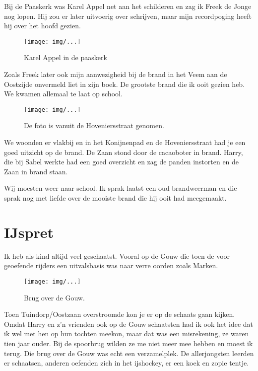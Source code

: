 \documentclass[10pt,twoside,openright]{memoir}
\begin{document}
Bij de Paaskerk was Karel Appel net aan het schilderen en zag ik Freek de Jonge nog lopen. Hij zou er later uitvoerig over schrijven, maar mijn recordpoging heeft hij over het hoofd gezien. 

\begin{figure}[t]
\texttt{[image: img/...]}
\caption{Karel Appel in de paaskerk}
\end{figure}

Zoals Freek later ook mijn aanwezigheid bij de brand in het Veem aan de Oostzijde onvermeld liet in zijn boek. De grootste brand die ik ooit gezien heb. We kwamen allemaal te laat op school. 

\begin{figure}[t]
\texttt{[image: img/...]}
\caption{De foto is vanuit de Hoveniersstraat genomen.}
\end{figure}

We woonden er vlakbij en in het Konijnenpad en de Hoveniersstraat had je een goed uitzicht op de brand. De Zaan stond door de cacaoboter in brand. Harry, die bij Sabel werkte had een goed overzicht en zag de panden instorten en de Zaan in brand staan.

Wij moesten weer naar school. Ik sprak laatst een oud brandweerman en die sprak nog met liefde over de mooiste brand die hij ooit had meegemaakt. 

\chapter{IJspret} %
\label{cha:ijspret}

Ik heb als kind altijd veel geschaatst. Vooral op de Gouw die toen de voor geoefende rijders een uitvalsbasis was naar verre oorden zoals Marken.

\begin{figure}[t]
\texttt{[image: img/...]}
\caption{Brug over de Gouw.}
\end{figure}

Toen Tuindorp/Oostzaan overstroomde kon je er op de schaats gaan kijken. Omdat Harry en z’n vrienden ook op de Gouw schaatsten had ik ook het idee dat ik wel met hen op hun tochten meekon, maar dat was een misrekening, ze waren tien jaar ouder. Bij de spoorbrug wilden ze me niet meer mee hebben en moest ik terug. Die brug over de Gouw was echt een verzamelplek. De allerjongsten leerden er schaatsen, anderen oefenden zich in het ijshockey, er een koek en zopie tentje.
\end{document}
